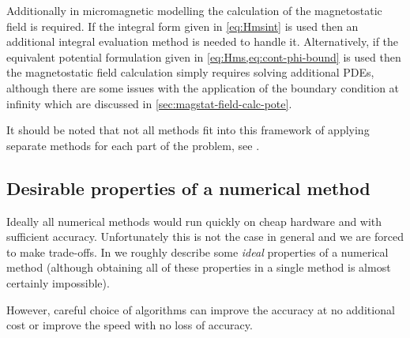 Additionally in micromagnetic modelling the calculation of the magnetostatic field is required.
If the integral form given in \cref{eq:Hmsint} is used then an additional integral evaluation method is needed to handle it.
Alternatively, if the equivalent potential formulation given in \cref{eq:Hms,eq:cont-phi-bound} is used then the magnetostatic field calculation simply requires solving additional PDEs, although there are some issues with the application of the boundary condition at infinity which are discussed in \cref{sec:magstat-field-calc-pote}.

It should be noted that not all methods fit into this framework of applying separate methods for each part of the problem, see \eg \cite{Alouges2006}.



\subsection{Desirable properties of a numerical method}
\label{sec:desir-prop-numer}

Ideally all numerical methods would run quickly on cheap hardware and with sufficient accuracy.
Unfortunately this is not the case in general and we are forced to make trade-offs.
In  we roughly describe some \emph{ideal} properties of a numerical method (although obtaining all of these properties in a single method is almost certainly impossible).

However, careful choice of algorithms can improve the accuracy at no additional cost or improve the speed with no loss of accuracy.


